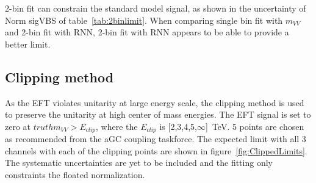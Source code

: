 \begin{table}[ht!]
\small
\begin{center}
\caption{Expected signal strength and limits in each two options. only \tlep channel is used for the fit. The result for single bin fit with RNN is also shown as a reference. The normarizations fitted for standard model signal, and Z and diboson backgrounds are shown as Norm in the table.}
\label{tab:2binlimit}
\end{center}
\end{table}

2-bin fit can constrain the standard model signal, as shown in the uncertainty of Norm sigVBS of table~\ref{tab:2binlimit}. 
When comparing single bin fit with $m_{VV}$ and 2-bin fit with RNN, 2-bin fit with RNN appears to be able to provide a better limit.

\subsection{Clipping method}
\label{subsec:clipping}
As the EFT violates unitarity at large energy scale, the clipping method is used to preserve the unitarity at high center of mass energies. The EFT signal is set to zero at $truth m_{VV} > E_{clip}$, where the $E_{clip}$ is [2,3,4,5,$\infty$]~TeV. 5 points are chosen as recommended from the aGC coupling taskforce.\cite{ATL-COM-PHYS-2017-433} 
The expected limit with all 3 channels with each of the clipping points are shown in figure~\ref{fig:ClippedLimits}. 
The systematic uncertainties are yet to be included and the fitting only constraints the floated normalization.

